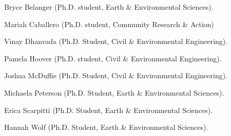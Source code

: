 \item Bryce Belanger (Ph.D. student, Earth \& Environmental Sciences).
\item Mariah Caballero (Ph.D. student, Community Research \& Action)
\item Vinay Dhanvada (Ph.D. Student, Civil \& Environmental Engineering).
\item Pamela Hoover (Ph.D. student, Civil \& Environmental Engineering).
\item Joshua McDuffie (Ph.D. Student, Civil \& Environmental Engineering).
\item Michaela Peterson (Ph.D. Student, Earth \& Environmental Sciences).
\item Erica Scarpitti (Ph.D. Student, Earth \& Environmental Sciences).
\item Hannah  Wolf (Ph.D. Student, Earth \& Environmental Sciences).